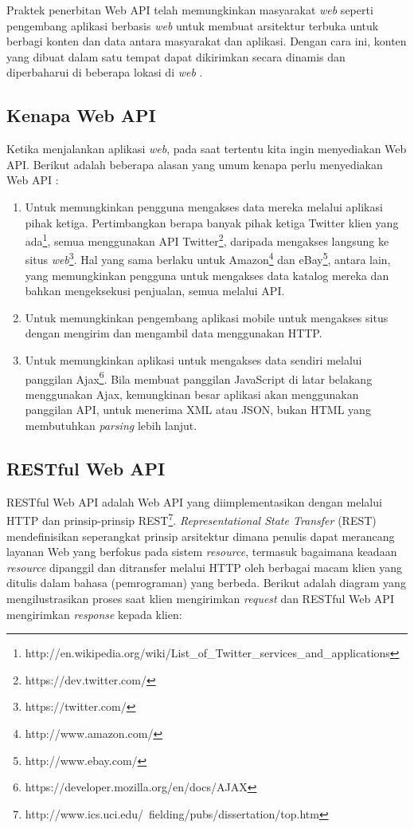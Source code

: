 \documentclass[a4paper, 12pt, oneside]{report}
\begin{document}
\onehalfspacing Praktek penerbitan Web API telah memungkinkan masyarakat \textit{web} seperti \newline pengembang aplikasi berbasis \textit{web} untuk membuat arsitektur terbuka untuk berbagi konten dan data antara masyarakat dan aplikasi. Dengan cara ini, konten yang dibuat dalam satu tempat dapat dikirimkan secara dinamis dan diperbaharui di beberapa lokasi di \textit{web} \cite{api-wikipedia}.

\subsection{Kenapa Web API}
Ketika menjalankan aplikasi \textit{web}, pada saat tertentu kita ingin menyediakan Web API. Berikut adalah beberapa alasan yang umum kenapa perlu menyediakan Web API \cite{apis-linux-journal}:

\begin{enumerate}
  \item Untuk memungkinkan pengguna mengakses data mereka melalui aplikasi pihak ketiga. Pertimbangkan berapa banyak pihak ketiga Twitter klien yang ada\footnote{http://en.wikipedia.org/wiki/List\_of\_Twitter\_services\_and\_applications}, semua menggunakan API Twitter\footnote{https://dev.twitter.com/}, daripada mengakses langsung ke situs \textit{web}\footnote{https://twitter.com/}. Hal yang sama berlaku untuk Amazon\footnote{http://www.amazon.com/} dan eBay\footnote{http://www.ebay.com/}, antara lain, yang memungkinkan pengguna untuk mengakses data katalog mereka dan bahkan mengeksekusi penjualan, semua melalui API.
  \item Untuk memungkinkan pengembang aplikasi mobile untuk mengakses situs dengan mengirim dan mengambil data menggunakan HTTP.
  \item Untuk memungkinkan aplikasi untuk mengakses data sendiri melalui panggilan Ajax\footnote{https://developer.mozilla.org/en/docs/AJAX}. Bila membuat panggilan JavaScript di latar belakang menggunakan Ajax, kemungkinan besar aplikasi akan menggunakan panggilan API, untuk menerima XML atau JSON, bukan HTML yang membutuhkan \textit{parsing} lebih lanjut.
\end{enumerate}

\subsection{RESTful Web API}

\onehalfspacing RESTful Web API adalah Web API yang diimplementasikan dengan melalui HTTP dan prinsip-prinsip REST\footnote{http://www.ics.uci.edu/~fielding/pubs/dissertation/top.htm}. \textit{Representational State Transfer} (REST) mendefinisikan seperangkat prinsip arsitektur dimana penulis dapat merancang layanan Web yang berfokus pada sistem \textit{resource}, termasuk bagaimana keadaan \textit{resource} dipanggil dan ditransfer melalui HTTP oleh berbagai macam klien yang ditulis dalam bahasa (pemrograman) yang berbeda. Berikut adalah diagram yang mengilustrasikan proses saat klien mengirimkan \textit{request} dan RESTful Web API mengirimkan \textit{response} kepada klien:
\end{document}
